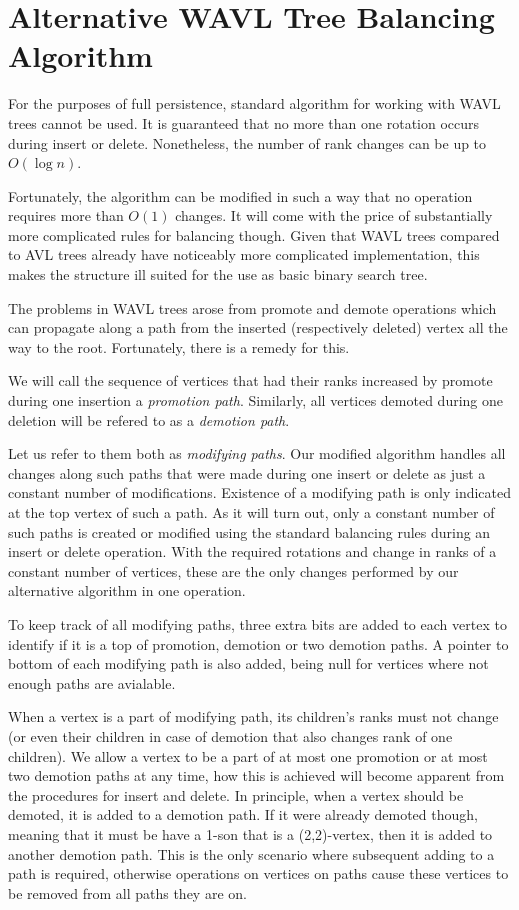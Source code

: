 \section{Alternative WAVL Tree Balancing Algorithm}

For the purposes of full persistence, standard algorithm for working with WAVL trees cannot be used. It is guaranteed that no more than one rotation occurs during insert or delete. Nonetheless, the number of rank changes can be up to $O(\log n)$. 

Fortunately, the algorithm can be modified in such a way that no operation requires more than $O(1)$ changes. It will come with the price of substantially more complicated rules for balancing though. Given that WAVL trees compared to AVL trees already have noticeably more complicated implementation, this makes the structure ill suited for the use as basic binary search tree. 

The problems in WAVL trees arose from promote and demote operations which can propagate along a path from the inserted (respectively deleted) vertex all the way to the root. Fortunately, there is a remedy for this. 

We will call the sequence of vertices that had their ranks increased by promote during one insertion a {\em promotion path}. Similarly, all vertices demoted during one deletion will be refered to as a {\em demotion path}.

Let us refer to them both as {\em modifying paths}. Our modified algorithm handles all changes along such paths that were made during one insert or delete as just a constant number of modifications. Existence of a modifying path is only indicated at the top vertex of such a path. As it will turn out, only a constant number of such paths is created or modified using the standard balancing rules during an insert or delete operation. With the required rotations and change in ranks of a constant number of vertices, these are the only changes performed by our alternative algorithm in one operation.

To keep track of all modifying paths, three extra bits are added to each vertex to identify if it is a top of promotion, demotion or two demotion paths. A pointer to bottom of each modifying path is also added, being null for vertices where not enough paths are avialable.

When a vertex is a part of modifying path, its children's ranks must not change (or even their children in case of demotion that also changes rank of one children). We allow a vertex to be a part of at most one promotion or at most two demotion paths at any time, how this is achieved will become apparent from the procedures for insert and delete. In principle, when a vertex should be demoted, it is added to a demotion path. If it were already demoted though, meaning that it must be have a 1-son that is a (2,2)-vertex, then it is added to another demotion path. This is the only scenario where subsequent adding to a path is required, otherwise operations on vertices on paths cause these vertices to be removed from all paths they are on.


